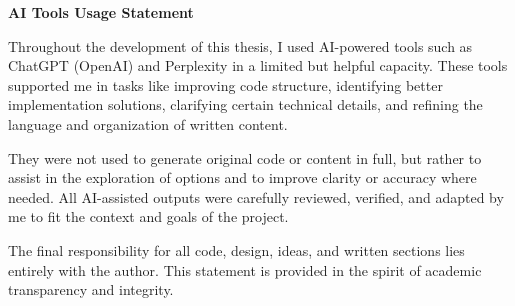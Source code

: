 ﻿\documentclass[12pt,a4paper]{article}
\begin{document}
\newpage
\thispagestyle{empty}
\vspace*{4cm}

\begin{center}
    \Large \textbf{AI Tools Usage Statement}
\end{center}

\vspace{1.5cm}

\noindent
Throughout the development of this thesis, I used AI-powered tools such as ChatGPT (OpenAI) and Perplexity in a limited but helpful capacity. These tools supported me in tasks like improving code structure, identifying better implementation solutions, clarifying certain technical details, and refining the language and organization of written content.

\vspace{0.5cm}

\noindent
They were not used to generate original code or content in full, but rather to assist in the exploration of options and to improve clarity or accuracy where needed. All AI-assisted outputs were carefully reviewed, verified, and adapted by me to fit the context and goals of the project.

\vspace{0.5cm}

\noindent
The final responsibility for all code, design, ideas, and written sections lies entirely with the author. This statement is provided in the spirit of academic transparency and integrity.


\newpage
\printbibliography[heading=bibintoc,title=Bibliography]
\end{document}
